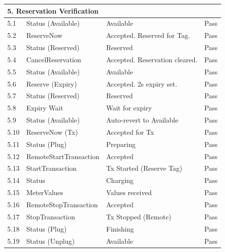 \documentclass[a4paper,11pt]{report}
\begin{document}
\begin{footnotesize}
\begin{footnotesize}
\begin{longtable}{|p{1.0cm}|p{4.5cm}|p{6.5cm}|c|}
\multicolumn{4}{|l|}{\textbf{5. Reservation Verification}} \\
\hline
5.1 & Status (Available) & Available & Pass \\
\hline
5.2 & ReserveNow & Accepted. Reserved for Tag. & Pass \\
\hline
5.3 & Status (Reserved) & Reserved & Pass \\
\hline
5.4 & CancelReservation & Accepted. Reservation cleared. & Pass \\
\hline
5.5 & Status (Available) & Available & Pass \\
\hline
5.6 & Reserve (Expiry) & Accepted. 2s expiry set. & Pass \\
\hline
5.7 & Status (Reserved) & Reserved & Pass \\
\hline
5.8 & Expiry Wait & Wait for expiry & Pass \\
\hline
5.9 & Status (Available) & Auto-revert to Available & Pass \\
\hline
5.10 & ReserveNow (Tx) & Accepted for Tx & Pass \\
\hline
5.11 & Status (Plug) & Preparing & Pass \\
\hline
5.12 & RemoteStartTransaction & Accepted & Pass \\
\hline
5.13 & StartTransaction & Tx Started (Reserve Tag) & Pass \\
\hline
5.14 & Status & Charging & Pass \\
\hline
5.15 & MeterValues & Values received & Pass \\
\hline
5.16 & RemoteStopTransaction & Accepted & Pass \\
\hline
5.17 & StopTransaction & Tx Stopped (Remote) & Pass \\
\hline
5.18 & Status (Plug) & Finishing & Pass \\
\hline
5.19 & Status (Unplug) & Available & Pass \\
\hline


\end{longtable}
\end{footnotesize}
\end{footnotesize}
\end{document}
